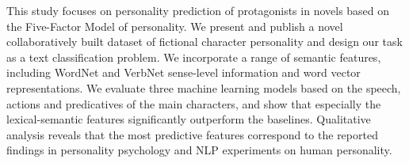 This study focuses on personality prediction of protagonists in novels based on the Five-Factor Model of personality. We present and publish a novel collaboratively built dataset of fictional character personality and design our task as a text classification problem. We incorporate a range of semantic features, including WordNet and VerbNet sense-level information and word vector representations. We evaluate three machine learning models based on the speech, actions and predicatives of the main characters, and show that especially the lexical-semantic features significantly outperform the baselines. Qualitative analysis reveals that the most predictive features correspond to the reported findings in personality psychology and NLP experiments on human personality.
